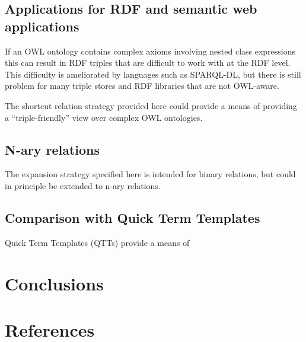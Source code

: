 \documentclass{llncs}
\begin{document}
\subsection{Applications for RDF and semantic web applications}

If an OWL ontology contains complex axioms involving nested class
expressions this can result in RDF triples that are difficult to work
with at the RDF level. This difficulty is ameliorated by languages
such as SPARQL-DL, but there is still problem for many triple stores
and RDF libraries that are not OWL-aware.

The shortcut relation strategy provided here could provide a means of
providing a ``triple-friendly'' view over complex OWL ontologies.

\subsection{N-ary relations}

The expansion strategy specified here is intended for binary
relations, but could in principle be extended to n-ary relations.

\subsection{Comparison with Quick Term Templates}

Quick Term Templates (QTTs)\cite{QTT2009} provide a means of


\section{Conclusions}

\section{References}



\end{document}
